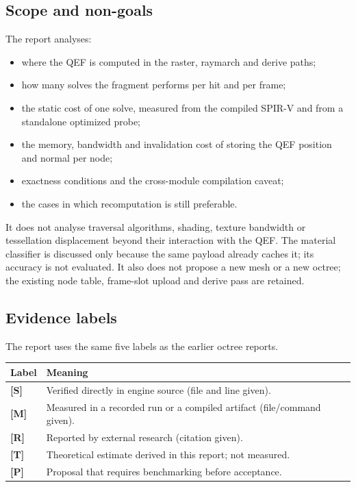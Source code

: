 \documentclass[11pt,a4paper]{article}
\newcommand{\evS}{\textsf{\textbf{\color{evS}[S]}}}
\newcommand{\evM}{\textsf{\textbf{\color{evM}[M]}}}
\newcommand{\evR}{\textsf{\textbf{\color{evR}[R]}}}
\newcommand{\evT}{\textsf{\textbf{\color{evT}[T]}}}
\newcommand{\evP}{\textsf{\textbf{\color{evP}[P]}}}
\theoremstyle{plain}
\theoremstyle{definition}
\theoremstyle{remark}
\begin{document}
\subsection{Scope and non-goals}

The report analyses:
\begin{itemize}[leftmargin=1.3em,itemsep=1pt]
\item where the QEF is computed in the raster, raymarch and derive paths;
\item how many solves the fragment performs per hit and per frame;
\item the static cost of one solve, measured from the compiled SPIR-V and from
      a standalone optimized probe;
\item the memory, bandwidth and invalidation cost of storing the QEF position
      and normal per node;
\item exactness conditions and the cross-module compilation caveat;
\item the cases in which recomputation is still preferable.
\end{itemize}
It does not analyse traversal algorithms, shading, texture bandwidth or
tessellation displacement beyond their interaction with the QEF. The material
classifier is discussed only because the same payload already caches it; its
accuracy is not evaluated. It also does not propose a new mesh or a new
octree; the existing node table, frame-slot upload and derive pass are
retained.

\subsection{Evidence labels}

The report uses the same five labels as the earlier octree reports.

\begin{center}
\begin{tabular}{@{}ll@{}}
\toprule
Label & Meaning \\
\midrule
\evS & Verified directly in engine source (file and line given). \\
\evM & Measured in a recorded run or a compiled artifact (file/command given). \\
\evR & Reported by external research (citation given). \\
\evT & Theoretical estimate derived in this report; not measured. \\
\evP & Proposal that requires benchmarking before acceptance. \\
\bottomrule
\end{tabular}
\end{center}
\end{document}

